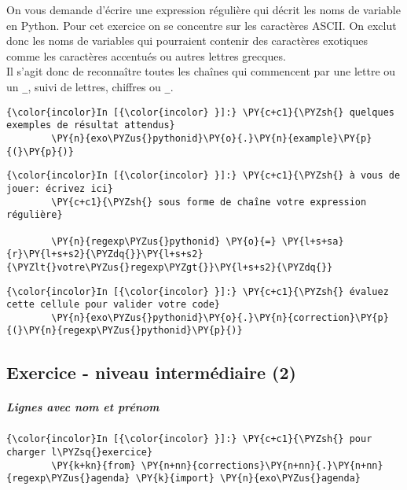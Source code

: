     On vous demande d'écrire une expression régulière qui décrit les noms de
variable en Python. Pour cet exercice on se concentre sur les caractères
ASCII. On exclut donc les noms de variables qui pourraient contenir des
caractères exotiques comme les caractères accentués ou autres lettres
grecques.\\

Il s'agit donc de reconnaître toutes les chaînes qui commencent par une
lettre ou un \texttt{\_}, suivi de lettres, chiffres ou \texttt{\_}.

    \begin{Verbatim}[commandchars=\\\{\}]
{\color{incolor}In [{\color{incolor} }]:} \PY{c+c1}{\PYZsh{} quelques exemples de résultat attendus}
        \PY{n}{exo\PYZus{}pythonid}\PY{o}{.}\PY{n}{example}\PY{p}{(}\PY{p}{)}
\end{Verbatim}


    \begin{Verbatim}[commandchars=\\\{\}]
{\color{incolor}In [{\color{incolor} }]:} \PY{c+c1}{\PYZsh{} à vous de jouer: écrivez ici}
        \PY{c+c1}{\PYZsh{} sous forme de chaîne votre expression régulière}
        
        \PY{n}{regexp\PYZus{}pythonid} \PY{o}{=} \PY{l+s+sa}{r}\PY{l+s+s2}{\PYZdq{}}\PY{l+s+s2}{\PYZlt{}votre\PYZus{}regexp\PYZgt{}}\PY{l+s+s2}{\PYZdq{}}
\end{Verbatim}


    \begin{Verbatim}[commandchars=\\\{\}]
{\color{incolor}In [{\color{incolor} }]:} \PY{c+c1}{\PYZsh{} évaluez cette cellule pour valider votre code}
        \PY{n}{exo\PYZus{}pythonid}\PY{o}{.}\PY{n}{correction}\PY{p}{(}\PY{n}{regexp\PYZus{}pythonid}\PY{p}{)}
\end{Verbatim}


    \hypertarget{exercice---niveau-intermuxe9diaire-2}{%
\subsection{Exercice - niveau intermédiaire
(2)}\label{exercice---niveau-intermuxe9diaire-2}}

    \hypertarget{lignes-avec-nom-et-pruxe9nom}{%
\subparagraph{Lignes avec nom et
prénom}\label{lignes-avec-nom-et-pruxe9nom}}

    \begin{Verbatim}[commandchars=\\\{\}]
{\color{incolor}In [{\color{incolor} }]:} \PY{c+c1}{\PYZsh{} pour charger l\PYZsq{}exercice}
        \PY{k+kn}{from} \PY{n+nn}{corrections}\PY{n+nn}{.}\PY{n+nn}{regexp\PYZus{}agenda} \PY{k}{import} \PY{n}{exo\PYZus{}agenda}
\end{Verbatim}


